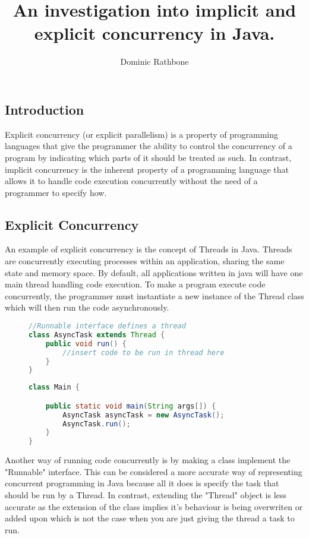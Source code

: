 \documentclass[]{report}
\title{An investigation into implicit and explicit concurrency in Java.}
\author{Dominic Rathbone}
\begin{document}
\maketitle

\subsection{Introduction}
Explicit concurrency (or explicit parallelism) is a property of programming languages that give the programmer the ability to control the concurrency of a program by indicating which parts of it should be treated as such. In contrast, implicit concurrency is the inherent property of a programming language that allows it to handle code execution concurrently without the need of a programmer to specify how.

\subsection{Explicit Concurrency}
An example of explicit concurrency is the concept of Threads in Java. Threads are concurrently executing processes within an application, sharing the same state and memory space. By default, all applications written in java will have one main thread handling code execution. To make a program execute code concurrently, the programmer must instantiate a new instance of the Thread class which will then run the code asynchronously. \cite{Threading}

\begin{figure}[h!]
\caption{}
\begin{lstlisting}[language=Java,frame=single]
//Runnable interface defines a thread
class AsyncTask extends Thread {
	public void run() {
		//insert code to be run in thread here
	}
}
\end{lstlisting}
\end{figure}

\begin{figure}[h!]
\caption{}
\begin{lstlisting}[language=Java,frame=single]
class Main {

	public static void main(String args[]) { 
		AsyncTask asyncTask = new AsyncTask();
		AsyncTask.run();
	}
}
\end{lstlisting}
\end{figure}

Another way of running code concurrently is by making a class implement the "Runnable" interface.\cite{Threading} This can be considered a more accurate way of representing concurrent programming in Java because all it does is specify the task that should be run by a Thread. In contrast, extending the "Thread" object is less accurate as the extension of the class implies it's behaviour is being overwriten or added upon which is not the case when you are just giving the thread a task to run. 
\end{document}
